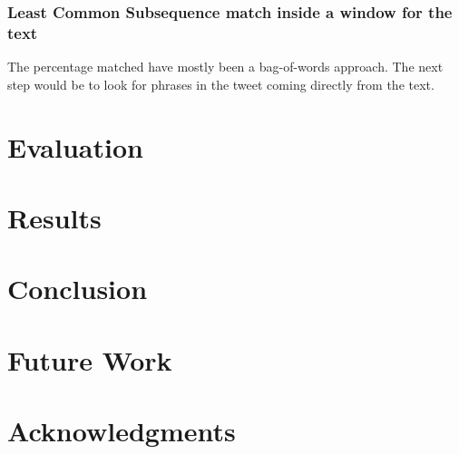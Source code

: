\documentclass[11pt]{article}
\begin{document}
\subsubsection{Least Common Subsequence match inside a window for the text}

The percentage matched have mostly been a bag-of-words approach. The next step would be to look for phrases in the tweet coming directly from the text.

\section{Evaluation}

\section{Results}

\section{Conclusion}

\section{Future Work}

\section*{Acknowledgments}




\end{document}
